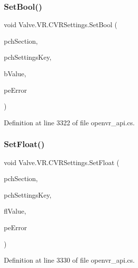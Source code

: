 \subsubsection{\texorpdfstring{SetBool()}{SetBool()}}
{\footnotesize\ttfamily void Valve.\+V\+R.\+C\+V\+R\+Settings.\+Set\+Bool (\begin{DoxyParamCaption}\item[{string}]{pch\+Section,  }\item[{string}]{pch\+Settings\+Key,  }\item[{bool}]{b\+Value,  }\item[{ref \mbox{\hyperlink{namespace_valve_1_1_v_r_aeab7722b211afc3885ed77faa931291f}{E\+V\+R\+Settings\+Error}}}]{pe\+Error }\end{DoxyParamCaption})}



Definition at line 3322 of file openvr\+\_\+api.\+cs.

\mbox{\label{class_valve_1_1_v_r_1_1_c_v_r_settings_a1a193ea418f97a02c739c0f7fd17fc03}} 
\subsubsection{\texorpdfstring{SetFloat()}{SetFloat()}}
{\footnotesize\ttfamily void Valve.\+V\+R.\+C\+V\+R\+Settings.\+Set\+Float (\begin{DoxyParamCaption}\item[{string}]{pch\+Section,  }\item[{string}]{pch\+Settings\+Key,  }\item[{float}]{fl\+Value,  }\item[{ref \mbox{\hyperlink{namespace_valve_1_1_v_r_aeab7722b211afc3885ed77faa931291f}{E\+V\+R\+Settings\+Error}}}]{pe\+Error }\end{DoxyParamCaption})}



Definition at line 3330 of file openvr\+\_\+api.\+cs.

\mbox{\label{class_valve_1_1_v_r_1_1_c_v_r_settings_a1d0d2179221adecadb03b36339513e0d}} 

